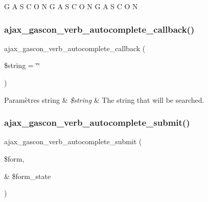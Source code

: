 G A S C O N G A S C O N G A S C O N \hypertarget{conjoc__gascon__web_form_8inc_a1be8e9edb4dcdb19c5b5bb88b48c5980}{}\label{conjoc__gascon__web_form_8inc_a1be8e9edb4dcdb19c5b5bb88b48c5980} 
\subsubsection{\texorpdfstring{ajax\+\_\+gascon\+\_\+verb\+\_\+autocomplete\+\_\+callback()}{ajax\_gascon\_verb\_autocomplete\_callback()}}
{\footnotesize\ttfamily ajax\+\_\+gascon\+\_\+verb\+\_\+autocomplete\+\_\+callback (\begin{DoxyParamCaption}\item[{}]{\$string = {\ttfamily \char`\"{}\char`\"{}} }\end{DoxyParamCaption})}


\begin{DoxyParams}[1]{Paramètres}
string & {\em \$string} & The string that will be searched. \\
\hline
\end{DoxyParams}
\hypertarget{conjoc__gascon__web_form_8inc_a332dbb7ab0a2190165164326af8cc7f1}{}\label{conjoc__gascon__web_form_8inc_a332dbb7ab0a2190165164326af8cc7f1} 
\subsubsection{\texorpdfstring{ajax\+\_\+gascon\+\_\+verb\+\_\+autocomplete\+\_\+submit()}{ajax\_gascon\_verb\_autocomplete\_submit()}}
{\footnotesize\ttfamily ajax\+\_\+gascon\+\_\+verb\+\_\+autocomplete\+\_\+submit (\begin{DoxyParamCaption}\item[{}]{\$form,  }\item[{\&}]{\$form\+\_\+state }\end{DoxyParamCaption})}

